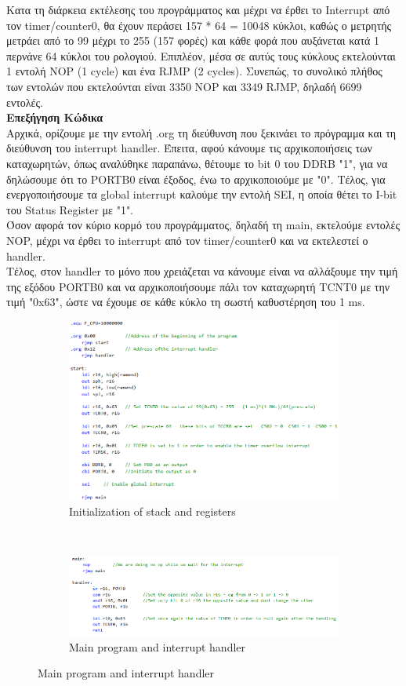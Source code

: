 \documentclass{article}
\begin{document}
\noindent
Κατα τη διάρκεια εκτέλεσης του προγράμματος και μέχρι να έρθει το Interrupt από τον timer/counter0, θα έχουν περάσει 157 * 64 = 10048 κύκλοι, καθώς ο μετρητής μετράει από το 99 μέχρι το 255 (157 φορές) και κάθε φορά που αυξάνεται κατά 1 περνάνε 64 κύκλοι του ρολογιού. Επιπλέον, μέσα σε αυτύς τους κύκλους εκτελούνται 1 εντολή NOP (1 cycle) και ένα RJMP (2 cycles). Συνεπώς, το συνολικό πλήθος των εντολών που εκτελούνται είναι 3350 NOP και 3349 RJMP, δηλαδή 6699 εντολές.\\

\noindent
\textbf{Επεξήγηση Κώδικα} \\
\noindent
Aρχικά, ορίζουμε με την εντολή .org τη διεύθυνση που ξεκινάει το πρόγραμμα και τη διεύθυνση του interrupt handler. Έπειτα, αφού κάνουμε τις αρχικοποιήσεις των καταχωρητών, όπως αναλύθηκε παραπάνω, θέτουμε το bit 0 του DDRB "1", για να δηλώσουμε ότι το PORTB0 είναι έξοδος, ένω το αρχικοποιούμε με "0". Tέλος, για ενεργοποιήσουμε τα global interrupt καλούμε την εντολή SEI, η οποία θέτει το I-bit του Status Register με "1".\\

\noindent
Όσον αφορά τον κύριο κορμό του προγράμματος, δηλαδή τη main, εκτελούμε εντολές NOP, μέχρι να έρθει το interrupt από τον timer/counter0 και να εκτελεστεί ο handler.\\

\noindent
Tἐλος, στον handler το μόνο που χρειάζεται να κάνουμε είναι να αλλάξουμε την τιμή της εξόδου PORTB0 και να αρχικοποιήσουμε πάλι τον καταχωρητή TCNT0 με την τιμή "0x63", ώστε να έχουμε σε κάθε κύκλο τη σωστή καθυστέρηση του 1 ms.

\begin{figure}[h!]
	\centering
	\begin{subfigure}[t]{0.5\textwidth}
		\centering
		\includegraphics[width=0.6\linewidth]{./results/lab1b_init_code.png}
		\caption{Initialization of stack and registers}
	\end{subfigure}%
	~
	\begin{subfigure}[t]{0.5\textwidth}
		\centering
		\includegraphics[width=\linewidth]{./results/lab1b_handler_code.png}
		\caption{Main program and interrupt handler}
	\end{subfigure}
\end{figure}
\end{document}
